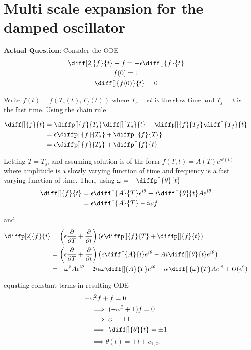 \section{Multi scale expansion for the damped oscillator}%
\label{sec:4}

\textbf{Actual Question}: Consider the ODE
\begin{gather*}
  \diff[2]{f}{t}+f= -\epsilon \diff[]{f}{t} \\
  f(0) = 1 \\
  \diff[]{f(0)}{t} = 0
\end{gather*}

Write $f(t) = f(T_{s}(t),T_{f}(t))$ where $T_{s}=\epsilon t$ is the slow time and
$T_{f} = t$ is the fast time. Using the chain rule 

\begin{align*}
  \diff[]{f}{t} &= \diffp[]{f}{T_{s}}\diff[]{T_{s}}{t} + \diffp[]{f}{T_{f}}
  \diff[]{T_{f}}{t} \\
                &= \epsilon \diffp[]{f}{T_{s}} + \diffp[]{f}{T_{f}} \\
                &= \epsilon \diffp[]{f}{T_{s}} + \diffp[]{f}{t}
\end{align*}

Letting $T = T_{s}$, and assuming solution is of the form $f(T,t) = A(T)e^{i
\theta(t)}$ where amplitude is a slowly varying function of time and frequency
is a fast varying function of time. Then, using $ \omega = - \diffp[]{\theta}{t}$
\begin{align*}
  \diff[]{f}{t} &= \epsilon \diff[]{A}{T}e^{i\theta } + i \diff[]{\theta
  }{t}Ae^{i \theta } \\
  &= \epsilon \diff[]{A}{T} - i \omega f
\end{align*}

and
\begin{align*}
  \diffp[2]{f}{t} &= \left(\epsilon \frac{\partial}{\partial T}
  + \frac{\partial}{\partial t}\right) \left(\epsilon \diffp[]{f}{T}
+ \diffp[]{f}{t} \right) \\
                  &= \left(\epsilon \frac{\partial}{\partial T}
  + \frac{\partial}{\partial t}\right) \left(\epsilon \diff[]{A}{t}e^{i\theta
  } + Ai \diff[]{\theta }{t}e^{i \theta }\right) \\
  &= -\omega ^2 A e^{i \theta } - 2i\epsilon \omega \diff[]{A}{T}e^{i \theta
  } - i \epsilon \diff[]{\omega}{T} A e^{i \theta } + O (\epsilon ^2)
\end{align*}

equating constant terms in resulting ODE
\begin{align*}
  -&\omega ^2 f + f = 0 \\
  &\implies (-\omega^2+1)f = 0\\
  &\implies \omega = \pm 1 \\
  &\implies \diff[]{\theta }{t} = \pm 1 \\
\end{align*}
\[
  \boxed{\implies \theta(t) = \pm t + c_{1,2}}
.\] 

